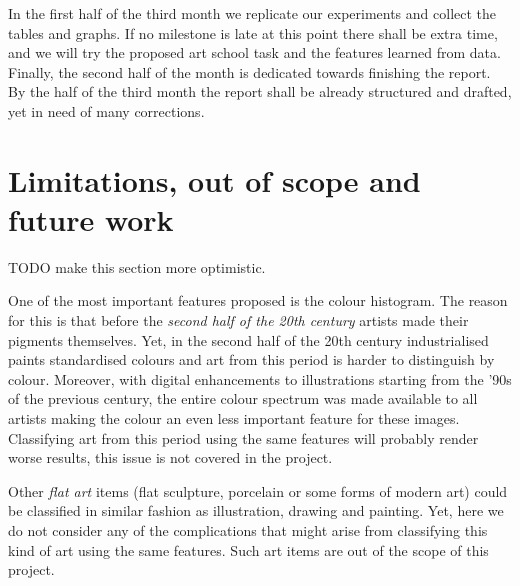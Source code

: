 \documentclass[a4paper]{article}
\begin{document}
In the first half of the third month we replicate our experiments and collect
the tables and graphs.  If no milestone is late at this point there shall be
extra time, and we will try the proposed art school task and the features
learned from data.  Finally, the second half of the month is dedicated towards
finishing the report.  By the half of the third month the report shall be
already structured and drafted, yet in need of many corrections.

\section{Limitations, out of scope and future work}

TODO make this section more optimistic.

One of the most important features proposed is the colour histogram.  The
reason for this is that before the \emph{second half of the 20th century}
artists made their pigments themselves.  Yet, in the second half of the 20th
century industrialised paints standardised colours and art from this period is
harder to distinguish by colour.  Moreover, with digital enhancements to
illustrations starting from the '90s of the previous century, the entire colour
spectrum was made available to all artists making the colour an even less
important feature for these images.  Classifying art from this period using the
same features will probably render worse results, this issue is not covered in
the project.

Other \emph{flat art} items (flat sculpture, porcelain or some forms of modern
art) could be classified in similar fashion as illustration, drawing and
painting.  Yet, here we do not consider any of the complications that might
arise from classifying this kind of art using the same features.  Such art
items are out of the scope of this project.



\end{document}
